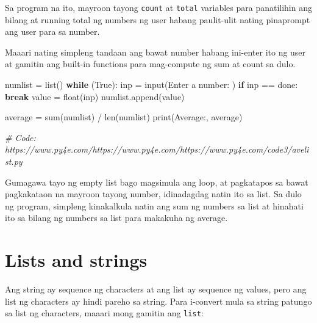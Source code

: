 \documentclass[10pt,]{book}
\newenvironment{Shaded}{}{}
\newcommand{\BuiltInTok}[1]{\textcolor[rgb]{0.00,0.50,0.00}{#1}}
\newcommand{\CommentTok}[1]{\textcolor[rgb]{0.38,0.63,0.69}{\textit{#1}}}
\newcommand{\ControlFlowTok}[1]{\textcolor[rgb]{0.00,0.44,0.13}{\textbf{#1}}}
\newcommand{\NormalTok}[1]{#1}
\newcommand{\OperatorTok}[1]{\textcolor[rgb]{0.40,0.40,0.40}{#1}}
\newcommand{\StringTok}[1]{\textcolor[rgb]{0.25,0.44,0.63}{#1}}
\newcommand{\VariableTok}[1]{\textcolor[rgb]{0.10,0.09,0.49}{#1}}
\begin{document}
Sa program na ito, mayroon tayong \texttt{count} at \texttt{total}
variables para panatilihin ang bilang at running total ng numbers ng
user habang paulit-ulit nating pinaprompt ang user para sa number.

Maaari nating simpleng tandaan ang bawat number habang ini-enter ito ng
user at gamitin ang built-in functions para mag-compute ng sum at count
sa dulo.

\begin{Shaded}
\begin{Highlighting}[]
\NormalTok{numlist }\OperatorTok{=} \BuiltInTok{list}\NormalTok{()}
\ControlFlowTok{while}\NormalTok{ (}\VariableTok{True}\NormalTok{):}
\NormalTok{    inp }\OperatorTok{=} \BuiltInTok{input}\NormalTok{(}\StringTok{\textquotesingle{}Enter a number: \textquotesingle{}}\NormalTok{)}
    \ControlFlowTok{if}\NormalTok{ inp }\OperatorTok{==} \StringTok{\textquotesingle{}done\textquotesingle{}}\NormalTok{: }\ControlFlowTok{break}
\NormalTok{    value }\OperatorTok{=} \BuiltInTok{float}\NormalTok{(inp)}
\NormalTok{    numlist.append(value)}

\NormalTok{average }\OperatorTok{=} \BuiltInTok{sum}\NormalTok{(numlist) }\OperatorTok{/} \BuiltInTok{len}\NormalTok{(numlist)}
\BuiltInTok{print}\NormalTok{(}\StringTok{\textquotesingle{}Average:\textquotesingle{}}\NormalTok{, average)}

\CommentTok{\# Code: https://www.py4e.com/https://www.py4e.com/https://www.py4e.com/code3/avelist.py}
\end{Highlighting}
\end{Shaded}

Gumagawa tayo ng empty list bago magsimula ang loop, at pagkatapos sa
bawat pagkakataon na mayroon tayong number, idinadagdag natin ito sa
list. Sa dulo ng program, simpleng kinakalkula natin ang sum ng numbers
sa list at hinahati ito sa bilang ng numbers sa list para makakuha ng
average.

\section{Lists and strings}\label{lists-and-strings}

  

Ang string ay sequence ng characters at ang list ay sequence ng values,
pero ang list ng characters ay hindi pareho sa string. Para i-convert
mula sa string patungo sa list ng characters, maaari mong gamitin ang
\texttt{list}:
\end{document}
